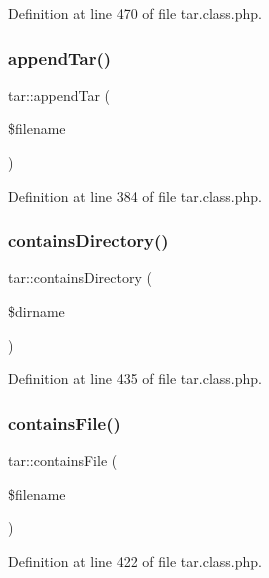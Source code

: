 Definition at line 470 of file tar.\+class.\+php.

\hypertarget{classtar_a3c35ee6b05a860a0108afa5853db4070}{}\label{classtar_a3c35ee6b05a860a0108afa5853db4070} 
\subsubsection{\texorpdfstring{append\+Tar()}{appendTar()}}
{\footnotesize\ttfamily tar\+::append\+Tar (\begin{DoxyParamCaption}\item[{}]{\$filename }\end{DoxyParamCaption})}



Definition at line 384 of file tar.\+class.\+php.

\hypertarget{classtar_aff90f763b61b935c856eb7e634a2c0a7}{}\label{classtar_aff90f763b61b935c856eb7e634a2c0a7} 
\subsubsection{\texorpdfstring{contains\+Directory()}{containsDirectory()}}
{\footnotesize\ttfamily tar\+::contains\+Directory (\begin{DoxyParamCaption}\item[{}]{\$dirname }\end{DoxyParamCaption})}



Definition at line 435 of file tar.\+class.\+php.

\hypertarget{classtar_ac7ba975f7bcf57d9a8167feb7122933e}{}\label{classtar_ac7ba975f7bcf57d9a8167feb7122933e} 
\subsubsection{\texorpdfstring{contains\+File()}{containsFile()}}
{\footnotesize\ttfamily tar\+::contains\+File (\begin{DoxyParamCaption}\item[{}]{\$filename }\end{DoxyParamCaption})}



Definition at line 422 of file tar.\+class.\+php.

